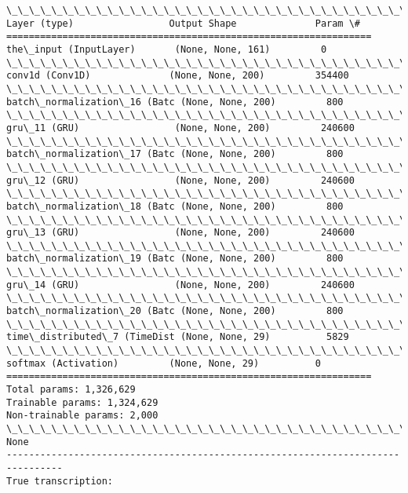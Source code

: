 \documentclass[11pt]{article}
\begin{document}
    \begin{Verbatim}[commandchars=\\\{\}]
\_\_\_\_\_\_\_\_\_\_\_\_\_\_\_\_\_\_\_\_\_\_\_\_\_\_\_\_\_\_\_\_\_\_\_\_\_\_\_\_\_\_\_\_\_\_\_\_\_\_\_\_\_\_\_\_\_\_\_\_\_\_\_\_\_
Layer (type)                 Output Shape              Param \#   
=================================================================
the\_input (InputLayer)       (None, None, 161)         0         
\_\_\_\_\_\_\_\_\_\_\_\_\_\_\_\_\_\_\_\_\_\_\_\_\_\_\_\_\_\_\_\_\_\_\_\_\_\_\_\_\_\_\_\_\_\_\_\_\_\_\_\_\_\_\_\_\_\_\_\_\_\_\_\_\_
conv1d (Conv1D)              (None, None, 200)         354400    
\_\_\_\_\_\_\_\_\_\_\_\_\_\_\_\_\_\_\_\_\_\_\_\_\_\_\_\_\_\_\_\_\_\_\_\_\_\_\_\_\_\_\_\_\_\_\_\_\_\_\_\_\_\_\_\_\_\_\_\_\_\_\_\_\_
batch\_normalization\_16 (Batc (None, None, 200)         800       
\_\_\_\_\_\_\_\_\_\_\_\_\_\_\_\_\_\_\_\_\_\_\_\_\_\_\_\_\_\_\_\_\_\_\_\_\_\_\_\_\_\_\_\_\_\_\_\_\_\_\_\_\_\_\_\_\_\_\_\_\_\_\_\_\_
gru\_11 (GRU)                 (None, None, 200)         240600    
\_\_\_\_\_\_\_\_\_\_\_\_\_\_\_\_\_\_\_\_\_\_\_\_\_\_\_\_\_\_\_\_\_\_\_\_\_\_\_\_\_\_\_\_\_\_\_\_\_\_\_\_\_\_\_\_\_\_\_\_\_\_\_\_\_
batch\_normalization\_17 (Batc (None, None, 200)         800       
\_\_\_\_\_\_\_\_\_\_\_\_\_\_\_\_\_\_\_\_\_\_\_\_\_\_\_\_\_\_\_\_\_\_\_\_\_\_\_\_\_\_\_\_\_\_\_\_\_\_\_\_\_\_\_\_\_\_\_\_\_\_\_\_\_
gru\_12 (GRU)                 (None, None, 200)         240600    
\_\_\_\_\_\_\_\_\_\_\_\_\_\_\_\_\_\_\_\_\_\_\_\_\_\_\_\_\_\_\_\_\_\_\_\_\_\_\_\_\_\_\_\_\_\_\_\_\_\_\_\_\_\_\_\_\_\_\_\_\_\_\_\_\_
batch\_normalization\_18 (Batc (None, None, 200)         800       
\_\_\_\_\_\_\_\_\_\_\_\_\_\_\_\_\_\_\_\_\_\_\_\_\_\_\_\_\_\_\_\_\_\_\_\_\_\_\_\_\_\_\_\_\_\_\_\_\_\_\_\_\_\_\_\_\_\_\_\_\_\_\_\_\_
gru\_13 (GRU)                 (None, None, 200)         240600    
\_\_\_\_\_\_\_\_\_\_\_\_\_\_\_\_\_\_\_\_\_\_\_\_\_\_\_\_\_\_\_\_\_\_\_\_\_\_\_\_\_\_\_\_\_\_\_\_\_\_\_\_\_\_\_\_\_\_\_\_\_\_\_\_\_
batch\_normalization\_19 (Batc (None, None, 200)         800       
\_\_\_\_\_\_\_\_\_\_\_\_\_\_\_\_\_\_\_\_\_\_\_\_\_\_\_\_\_\_\_\_\_\_\_\_\_\_\_\_\_\_\_\_\_\_\_\_\_\_\_\_\_\_\_\_\_\_\_\_\_\_\_\_\_
gru\_14 (GRU)                 (None, None, 200)         240600    
\_\_\_\_\_\_\_\_\_\_\_\_\_\_\_\_\_\_\_\_\_\_\_\_\_\_\_\_\_\_\_\_\_\_\_\_\_\_\_\_\_\_\_\_\_\_\_\_\_\_\_\_\_\_\_\_\_\_\_\_\_\_\_\_\_
batch\_normalization\_20 (Batc (None, None, 200)         800       
\_\_\_\_\_\_\_\_\_\_\_\_\_\_\_\_\_\_\_\_\_\_\_\_\_\_\_\_\_\_\_\_\_\_\_\_\_\_\_\_\_\_\_\_\_\_\_\_\_\_\_\_\_\_\_\_\_\_\_\_\_\_\_\_\_
time\_distributed\_7 (TimeDist (None, None, 29)          5829      
\_\_\_\_\_\_\_\_\_\_\_\_\_\_\_\_\_\_\_\_\_\_\_\_\_\_\_\_\_\_\_\_\_\_\_\_\_\_\_\_\_\_\_\_\_\_\_\_\_\_\_\_\_\_\_\_\_\_\_\_\_\_\_\_\_
softmax (Activation)         (None, None, 29)          0         
=================================================================
Total params: 1,326,629
Trainable params: 1,324,629
Non-trainable params: 2,000
\_\_\_\_\_\_\_\_\_\_\_\_\_\_\_\_\_\_\_\_\_\_\_\_\_\_\_\_\_\_\_\_\_\_\_\_\_\_\_\_\_\_\_\_\_\_\_\_\_\_\_\_\_\_\_\_\_\_\_\_\_\_\_\_\_
None
--------------------------------------------------------------------------------
True transcription:


\end{Verbatim}
\end{document}
